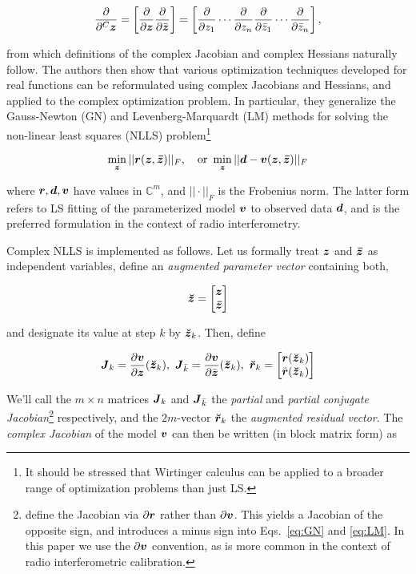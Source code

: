 \documentclass[useAMS,usenatbib]{mn2e}
\makeatletter
\newcommand{\COMPLEX}{\mathbb{C}}
\newcommand{\zz}{\bmath{z}}
\newcommand{\zzc}{\bmath{\bar z}}
\newcommand{\rr}{\bmath{r}}
\newcommand{\vv}{\bmath{v}}
\newcommand{\mat}[1]{{\bmath{#1}}}
\newcommand{\JJ}{\mat{J}} %
\newcommand{\Matrix}[2]{\left [ \begin{array}{@{}#1@{}}#2\end{array} \right ]}
\newcommand{\AUG}[1]{\bmath{\breve{#1}}}
\newcommand{\Zz}{\AUG{z}}
\newcommand{\Rr}{\AUG{r}}
\makeatother
\begin{document}
\[
\frac{\partial}{\partial^C \zz} = \left [ \frac{\partial}{\partial \zz} \frac{\partial}{\partial \bar{\zz}} \right ] = \left [ \frac{\partial}{\partial z_1} \cdots \frac{\partial}{\partial z_n}
\frac{\partial}{\partial \bar{z}_1} \cdots \frac{\partial}{\partial \bar{z}_n} \right ],
\]

from which definitions of the complex Jacobian and complex Hessians naturally follow. The authors then show 
that various optimization techniques developed for real functions can be reformulated using 
complex Jacobians and Hessians, and applied to the complex optimization problem. In particular, they generalize 
the Gauss-Newton (GN) and Levenberg-Marquardt (LM) methods for solving the non-linear least squares (NLLS) 
problem\footnote{It should be stressed that Wirtinger calculus can be applied to a broader range of 
optimization problems than just LS.}

\begin{equation}
\label{eq:LSmin}
\min_{\bmath{z}} ||\bmath{r}(\zz,\zzc)||_F,~~~\mathrm{or}~\min_{\bmath{z}} ||\bmath{d}-\bmath{v}(\zz,\zzc)||_F
\end{equation}

where $\bmath{r},\bmath{d},\bmath{v}$ have values in $\COMPLEX^m$, and $||\cdot||_F$ is the Frobenius norm. The latter form 
refers to LS fitting of the parameterized model $\bmath{v}$ to observed data $\bmath{d}$, and is the preferred formulation
in the context of radio interferometry.

Complex NLLS is implemented as follows. Let us formally treat $\zz$ and $\zzc$ as independent variables, 
define an {\em augmented parameter vector} containing both,



\[
\Zz = \Matrix{c}{\zz \\ \zzc}
\]


and designate its value at step $k$ by $\Zz_k$. Then, define


\begin{equation}
\label{eq:Jkrk}
\JJ_k=\frac{\partial \vv}{\partial \zz} (\Zz_k), ~\JJ_{\bar{k}}=\frac{\partial \vv}{\partial \bar{\zz}}(\Zz_k),~
\Rr_k=\Matrix{c}{\rr(\Zz_k)\\\bar{\rr}(\Zz_k)}
\end{equation}

We'll call the $m\times n$ matrices $\JJ_k$ and $\JJ_{\bar{k}}$ the \emph{partial} and \emph{partial conjugate 
Jacobian}\footnote{\citet{ComplexOpt} define the Jacobian via $\partial\rr$ rather than
$\partial\vv$. This yields a Jacobian of the opposite sign, and introduces a minus sign into 
Eqs.~\ref{eq:GN} and \ref{eq:LM}. In this paper we use the $\partial\vv$ convention, as is more common in the
context of radio interferometric calibration.}
respectively, 
and the $2m$-vector $\Rr_k$ the \emph{augmented residual vector}. The \emph{complex Jacobian} 
of the model $\vv$ can then be written (in block matrix form) as
\end{document}
